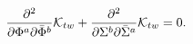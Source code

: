 \begin{equation}
\label{constraint2}
\frac{{\partial}^2}{\partial \Phi^{a}\partial {\bar \Phi}^{b}}{\cal K}_{tw}+
\frac{{\partial}^2}{\partial \Sigma^{b}\partial {\bar \Sigma}^a}{\cal K}_{tw}=0.
\end{equation}

